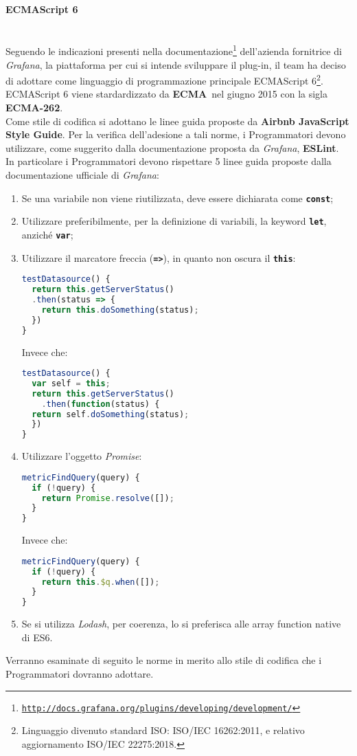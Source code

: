 \paragraph{ECMAScript 6}\label{EcmaScript6} \-\\
Seguendo le indicazioni presenti nella documentazione\footnote{\texttt{\url{http://docs.grafana.org/plugins/developing/development/}}} dell'azienda fornitrice di \textit{Grafana}, la piattaforma  per cui si intende sviluppare il plug-in, il team ha deciso di adottare come linguaggio di programmazione principale ECMAScript 6\footnote{Linguaggio divenuto standard ISO: ISO/IEC 16262:2011, e relativo aggiornamento ISO/IEC 22275:2018.}.\\
ECMAScript 6 viene stardardizzato da \textbf{ECMA}\glossario\ nel giugno 2015 con la sigla \textbf{ECMA-262}.\\
Come stile di codifica si adottano le linee guida proposte da \textbf{Airbnb JavaScript Style Guide}. Per la verifica dell'adesione a tali norme, i Programmatori devono utilizzare, come suggerito dalla documentazione proposta da \textit{Grafana}, \textbf{ESLint}\glossario.\\
In particolare i Programmatori devono rispettare 5 linee guida proposte dalla documentazione ufficiale di \textit{Grafana}:
\begin{enumerate}
	\item Se una variabile non viene riutilizzata, deve essere dichiarata come \texttt{\textbf{const}};
	\item Utilizzare preferibilmente, per la definizione di variabili, la keyword  \texttt{\textbf{let}}, anziché  \texttt{\textbf{var}};
	\item Utilizzare il marcatore freccia (\texttt{\textbf{=>}}), in quanto non oscura il \texttt{\textbf{this}}:
	\begin{lstlisting}[language=JavaScript]
testDatasource() {
  return this.getServerStatus()
  .then(status => {
    return this.doSomething(status);
  })
}	
	\end{lstlisting}
	Invece che:
	\begin{lstlisting}[language=JavaScript]
testDatasource() {
  var self = this;
  return this.getServerStatus()
    .then(function(status) {
  return self.doSomething(status);
  })
}
	\end{lstlisting}
	\item Utilizzare l'oggetto \textit{Promise}:
	\begin{lstlisting}[language=JavaScript]
metricFindQuery(query) {
  if (!query) {
    return Promise.resolve([]);
  }
}	
	\end{lstlisting}
	Invece che:
	\begin{lstlisting}[language=JavaScript]
metricFindQuery(query) {
  if (!query) {
    return this.$q.when([]);
  }
}
	\end{lstlisting}
	\item Se si utilizza \textit{Lodash}, per coerenza, lo si preferisca alle array function native di ES6.
\end{enumerate}
Verranno esaminate di seguito le norme in merito allo stile di codifica che i Programmatori dovranno adottare.

